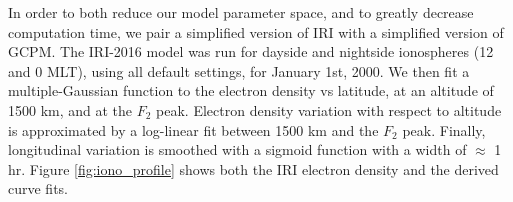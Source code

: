 In order to both reduce our model parameter space, and to greatly decrease computation time, we pair a simplified version of IRI with a simplified version of GCPM. The IRI-2016 model was run for dayside and nightside ionospheres (12 and 0 MLT), using all default settings, for January 1st, 2000. We then fit a multiple-Gaussian function to the electron density vs latitude, at an altitude of 1500 km, and at the $F_2$ peak. Electron density variation with respect to altitude is approximated by a log-linear fit between 1500 km and the $F_2$ peak. Finally, longitudinal variation is smoothed with a sigmoid function with a width of $\approx$ 1 hr. Figure \ref{fig:iono_profile} shows both the IRI electron density and the derived curve fits.


